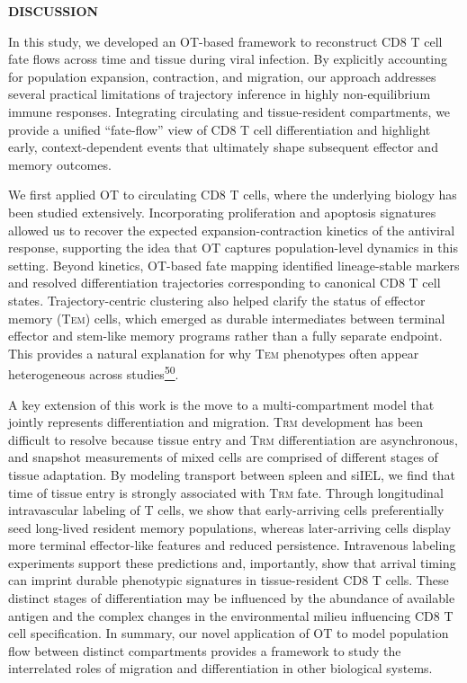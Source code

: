 \textbf{DISCUSSION}

In this study, we developed an OT-based framework to reconstruct CD8 T
cell fate flows across time and tissue during viral infection. By
explicitly accounting for population expansion, contraction, and
migration, our approach addresses several practical limitations of
trajectory inference in highly non-equilibrium immune responses.
Integrating circulating and tissue-resident compartments, we provide a
unified ``fate-flow'' view of CD8 T cell differentiation and highlight
early, context-dependent events that ultimately shape subsequent
effector and memory outcomes.

We first applied OT to circulating CD8 T cells, where the underlying
biology has been studied extensively. Incorporating proliferation and
apoptosis signatures allowed us to recover the expected
expansion-contraction kinetics of the antiviral response, supporting the
idea that OT captures population-level dynamics in this setting. Beyond
kinetics, OT-based fate mapping identified lineage-stable markers and
resolved differentiation trajectories corresponding to canonical CD8 T
cell states. Trajectory-centric clustering also helped clarify the
status of effector memory (T\textsc{em}) cells, which emerged as durable
intermediates between terminal effector and stem-like memory programs
rather than a fully separate endpoint. This provides a natural
explanation for why T\textsc{em} phenotypes often appear heterogeneous
across
studies\href{https://sciwheel.com/work/citation?ids=9725107\&pre=\&suf=\&sa=0\&dbf=0}{\textsuperscript{50}}.

A key extension of this work is the move to a multi-compartment model
that jointly represents differentiation and migration. T\textsc{rm}
development has been difficult to resolve because tissue entry and
T\textsc{rm} differentiation are asynchronous, and snapshot measurements
of mixed cells are comprised of different stages of tissue adaptation.
By modeling transport between spleen and siIEL, we find that time of
tissue entry is strongly associated with T\textsc{rm} fate. Through
longitudinal intravascular labeling of T cells, we show that
early-arriving cells preferentially seed long-lived resident memory
populations, whereas later-arriving cells display more terminal
effector-like features and reduced persistence. Intravenous labeling
experiments support these predictions and, importantly, show that
arrival timing can imprint durable phenotypic signatures in
tissue-resident CD8 T cells. These distinct stages of differentiation
may be influenced by the abundance of available antigen and the complex
changes in the environmental milieu influencing CD8 T cell
specification. In summary, our novel application of OT to model
population flow between distinct compartments provides a framework to
study the interrelated roles of migration and differentiation in other
biological systems.

